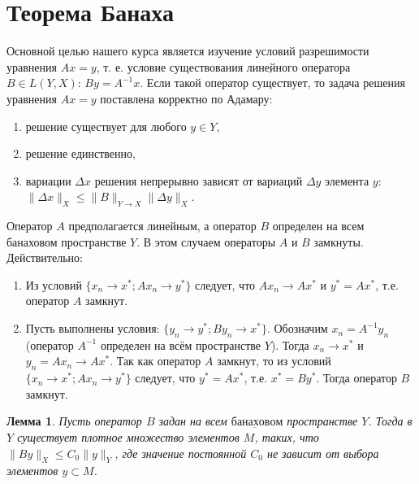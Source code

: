 \documentclass[12pt,a4paper,titlepage,oneside]{book}
\theoremstyle{definition}
\theoremstyle{plain}
\theoremstyle{remark}
\theoremstyle{remark}
\theoremstyle{remark}
\theoremstyle{remark}
\theoremstyle{plain}
\newtheorem*{lemma}{Лемма}
\theoremstyle{plain}
\begin{document}
\section{Теорема Банаха}
Основной целью нашего курса является изучение условий разрешимости уравнения $Ax=y$, т. е. условие существования $\underbar {линейного}$ оператора $B\in L(Y, X)$: $By=A^{-1}x$. Если такой оператор существует, то задача решения уравнения $Ax=y$ поставлена корректно по Адамару:
\begin{enumerate}
	\item решение существует для любого $y \in Y$,
	\item решение единственно,
	\item вариации $\Delta x$ решения непрерывно зависят от вариаций $\Delta y$ элемента $y$: $\lVert \Delta x\rVert_X \leq \lVert B\rVert_{Y\to X}\lVert \Delta y\rVert_X$.
\end{enumerate}
Оператор $A$ предполагается линейным, а оператор $B$ определен на всем банаховом пространстве $Y$. В этом случаем операторы $A$ и $B$ замкнуты. Действительно:
\begin{enumerate}

	\item Из условий $\{x_n \to x^{*};Ax_n \to y^{*}\}$ следует, что $Ax_n \to Ax^{*}$ и $y^{*}=Ax^{*}$, т.е. оператор $A$ замкнут.

	\item Пусть выполнены условия: $\{y_n \to y^{*}; By_n \to x^{*}\}$. Обозначим $x_n=A^{-1}y_n$ (оператор $A^{-1}$ определен на всём пространстве $Y$). Тогда $x_n \to x^{*}$ и $y_n=Ax_n \to Ax^{*}$. Так как оператор $A$ замкнут, то из условий $\{x_n \to x^{*};Ax_n \to y^{*}\}$ следует, что $y^{*}=Ax^{*}$, т.е. $x^{*}=By^{*}$. Тогда оператор $B$ замкнут.
	
\end{enumerate}
	
\begin{lemma}
Пусть оператор $B$ задан на всем $\underbar {банаховом}$ пространстве $Y$. Тогда в $Y$ существует плотное множество элементов $M$, таких, что $\lVert By\rVert_X \leq C_0\lVert y\rVert_Y $, где значение постоянной $C_0$ не зависит от выбора элементов $y \subset M$.
\end{lemma}
\end{document}
